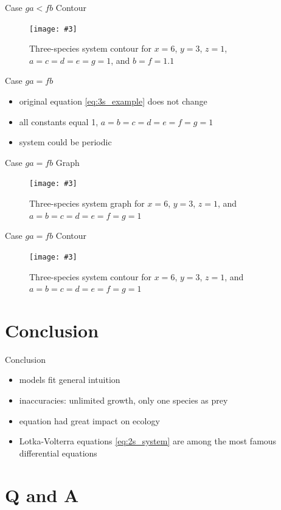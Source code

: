 \documentclass[hyperref={colorlinks,allcolors=black}]{beamer}
\newcommand{\makefig}[4]{
\begin{figure}[#1]
    \captionsetup{justification=centering}
    \texttt{[image: \#3]}
    \caption{#4}
    \label{fig:#3}
\end{figure}
}
\begin{document}
\begin{frame}{Case $ga < fb$ Contour}
\makefig{h}{0.65\textwidth}{3s_ga_l_fb_contour}{Three-species system contour for
$x=6$, $y=3$, $z=1$, $a=c=d=e=g=1$, and $b=f=1.1$}
\end{frame}

\begin{frame}{Case $ga=fb$}
\begin{itemize}
\setlength\itemsep{1em}
    \item original equation \eqref{eq:3s_example} does not change
    \item all constants equal 1, $a=b=c=d=e=f=g=1$
    \item system could be periodic
\end{itemize}
\end{frame}

\begin{frame}{Case $ga=fb$ Graph}
\makefig{h}{0.9\textwidth}{3s_ga_eq_fb_graph}{Three-species system graph for
$x=6$, $y=3$, $z=1$, and $a=b=c=d=e=f=g=1$}
\end{frame}

\begin{frame}{Case $ga=fb$ Contour}
\makefig{h}{0.65\textwidth}{3s_ga_eq_fb_contour}{Three-species system contour for
$x=6$, $y=3$, $z=1$, and $a=b=c=d=e=f=g=1$}
\end{frame}


\section{Conclusion}

\begin{frame}{Conclusion}
\begin{itemize}
\setlength\itemsep{1em}
    \item models fit general intuition
    \item inaccuracies: unlimited growth, only one species as prey
    \item equation had great impact on ecology \cite{wangersky}
    \item Lotka-Volterra equations \eqref{eq:2s_system} are among the most
        famous differential equations
\end{itemize}
\end{frame}

\section{Q and A}
\end{document}
